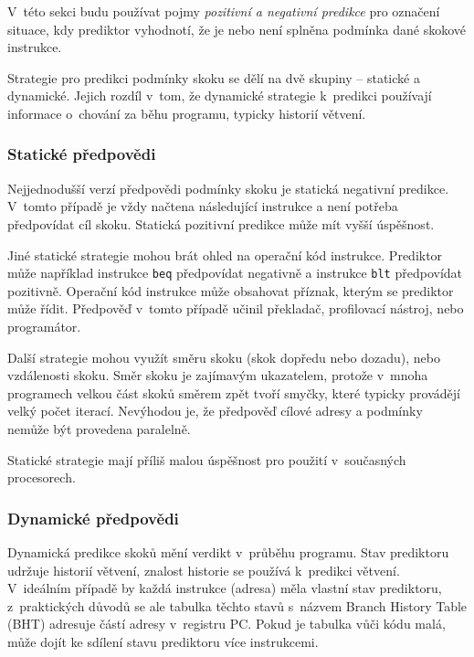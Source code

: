 V~této sekci budu používat pojmy \emph{pozitivní a negativní predikce} pro označení situace, kdy prediktor vyhodnotí, že je nebo není splněna podmínka dané skokové instrukce.

Strategie pro predikci podmínky skoku se dělí na dvě skupiny -- statické a dynamické.
Jejich rozdíl v~tom, že dynamické strategie k~predikci používají informace o~chování za běhu programu, typicky historií větvení.
\cite{branchStrategies}

\subsubsection{Statické předpovědi}

Nejjednodušší verzí předpovědi podmínky skoku je statická negativní predikce.
V~tomto případě je vždy načtena následující instrukce a není potřeba předpovídat cíl skoku.
Statická pozitivní predikce může mít vyšší úspěšnost.

Jiné statické strategie mohou brát ohled na operační kód instrukce.
Prediktor může například instrukce \texttt{beq} předpovídat negativně a instrukce \texttt{blt} předpovídat pozitivně.
Operační kód instrukce může obsahovat příznak, kterým se prediktor může řídit.
Předpověď v~tomto případě učinil překladač, profilovací nástroj, nebo programátor. \cite{branchStrategies}

Další strategie mohou využít směru skoku (skok dopředu nebo dozadu), nebo vzdálenosti skoku.
Směr skoku je zajímavým ukazatelem, protože v~mnoha programech velkou část skoků směrem zpět tvoří smyčky, které typicky provádějí velký počet iterací.
Nevýhodou je, že předpověď cílové adresy a podmínky nemůže být provedena paralelně.

Statické strategie mají příliš malou úspěšnost pro použití v~současných procesorech.

\subsubsection{Dynamické předpovědi}

Dynamická predikce skoků mění verdikt v~průběhu programu.
Stav prediktoru udržuje historií větvení, znalost historie se používá k~predikci větvení.
V~ideálním případě by každá instrukce (adresa) měla vlastní stav prediktoru, z~praktických důvodů se ale tabulka těchto stavů s~názvem Branch History Table (BHT) adresuje částí adresy v~registru PC.
Pokud je tabulka vůči kódu malá, může dojít ke sdílení stavu prediktoru více instrukcemi. \cite{OrganizationAndDesign}

